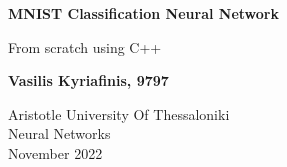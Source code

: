 \author{Vasilis Kyriafinis \\ email: \href{mailto:vakyriaf@ece.auth.gr}{vakyriaf@ece.auth.gr}} 

\makeatletter
\begin{titlepage}
    \begin{center}
        \vspace*{4cm}
 
        \textbf{\Large{MNIST Classification Neural Network}}
 
        \vspace{0.5cm}
        \large{From scratch using C++}
             
        \vspace{1cm}
 
        \textbf{Vasilis Kyriafinis, 9797}
 
        \vfill
                                
        Aristotle University Of Thessaloniki\\
        Neural Networks\\
        November 2022
        \vspace*{0cm}
             
    \end{center}
\end{titlepage}
